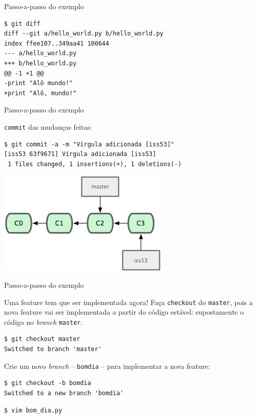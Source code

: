 \documentclass[portuguese,brazil]{beamer}
\begin{document}
\begin{frame}[fragile]{Passo-a-passo do exemplo}
\begin{verbatim}
$ git diff
diff --git a/hello_world.py b/hello_world.py
index ffee107..349aa41 100644
--- a/hello_world.py
+++ b/hello_world.py
@@ -1 +1 @@
-print "Alô mundo!"
+print "Alô, mundo!"
\end{verbatim}
\end{frame}

\begin{frame}[fragile]{Passo-a-passo do exemplo}
\begin{center}
\texttt{commit} das mudanças feitas:
\end{center}
\begin{verbatim}
$ git commit -a -m "Vírgula adicionada [iss53]"
[iss53 63f9671] Vírgula adicionada [iss53]
 1 files changed, 1 insertions(+), 1 deletions(-)
\end{verbatim}
\pause
\begin{center}
  \includegraphics{images/commitiss53.png}
\end{center}
\end{frame}

\begin{frame}[fragile]{Passo-a-passo do exemplo}
\begin{center}
Uma feature tem que ser implementada agora! Faça \texttt{checkout} do
\texttt{master}, pois a nova feature vai ser implementada a partir do código
estável: supostamente o código no \textit{branch} \texttt{master}.
\end{center}
\begin{verbatim}
$ git checkout master
Switched to branch 'master'
\end{verbatim}
\pause
\begin{center}
Crie um novo \textit{branch} -- \texttt{bomdia} -- para implementar a nova
feature:
\end{center}
\begin{verbatim}
$ git checkout -b bomdia
Switched to a new branch 'bomdia'
\end{verbatim}
\pause
\begin{verbatim}
$ vim bom_dia.py
\end{verbatim}
\end{frame}
\end{document}
